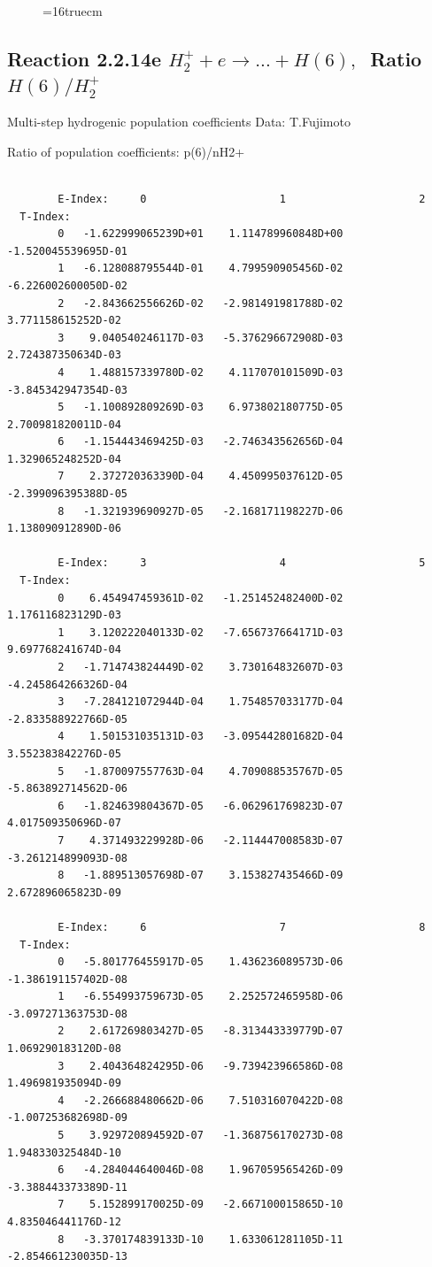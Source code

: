 \documentclass[12pt,dvips]{article}
\begin{document}
\begin{figure} \label{2.2.14d}
\epsfxsize=16truecm
\end{figure}
\newpage


\subsection{
Reaction 2.2.14e $ H_2^+ + e \rightarrow ...+ H(6) , \   $
Ratio $H(6)/H_2^+  $
}

 Multi-step hydrogenic population coefficients
 Data: T.Fujimoto

 Ratio of population coefficients: p(6)/nH2+

\begin{small}\begin{verbatim}

        E-Index:     0                     1                     2
  T-Index:
        0   -1.622999065239D+01    1.114789960848D+00   -1.520045539695D-01
        1   -6.128088795544D-01    4.799590905456D-02   -6.226002600050D-02
        2   -2.843662556626D-02   -2.981491981788D-02    3.771158615252D-02
        3    9.040540246117D-03   -5.376296672908D-03    2.724387350634D-03
        4    1.488157339780D-02    4.117070101509D-03   -3.845342947354D-03
        5   -1.100892809269D-03    6.973802180775D-05    2.700981820011D-04
        6   -1.154443469425D-03   -2.746343562656D-04    1.329065248252D-04
        7    2.372720363390D-04    4.450995037612D-05   -2.399096395388D-05
        8   -1.321939690927D-05   -2.168171198227D-06    1.138090912890D-06

        E-Index:     3                     4                     5
  T-Index:
        0    6.454947459361D-02   -1.251452482400D-02    1.176116823129D-03
        1    3.120222040133D-02   -7.656737664171D-03    9.697768241674D-04
        2   -1.714743824449D-02    3.730164832607D-03   -4.245864266326D-04
        3   -7.284121072944D-04    1.754857033177D-04   -2.833588922766D-05
        4    1.501531035131D-03   -3.095442801682D-04    3.552383842276D-05
        5   -1.870097557763D-04    4.709088535767D-05   -5.863892714562D-06
        6   -1.824639804367D-05   -6.062961769823D-07    4.017509350696D-07
        7    4.371493229928D-06   -2.114447008583D-07   -3.261214899093D-08
        8   -1.889513057698D-07    3.153827435466D-09    2.672896065823D-09

        E-Index:     6                     7                     8
  T-Index:
        0   -5.801776455917D-05    1.436236089573D-06   -1.386191157402D-08
        1   -6.554993759673D-05    2.252572465958D-06   -3.097271363753D-08
        2    2.617269803427D-05   -8.313443339779D-07    1.069290183120D-08
        3    2.404364824295D-06   -9.739423966586D-08    1.496981935094D-09
        4   -2.266688480662D-06    7.510316070422D-08   -1.007253682698D-09
        5    3.929720894592D-07   -1.368756170273D-08    1.948330325484D-10
        6   -4.284044640046D-08    1.967059565426D-09   -3.388443373389D-11
        7    5.152899170025D-09   -2.667100015865D-10    4.835046441176D-12
        8   -3.370174839133D-10    1.633061281105D-11   -2.854661230035D-13


\end{verbatim}
\end{small}
\end{document}
